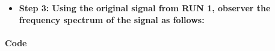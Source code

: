 \documentclass[11pt]{article}
\providecommand{\tightlist}{%
      \setlength{\itemsep}{0pt}\setlength{\parskip}{0pt}}
\begin{document}
    \begin{center}
    \end{center}
    { \hspace*{\fill} \\}
    
    \begin{center}
    \end{center}
    { \hspace*{\fill} \\}
    
    \begin{itemize}
\tightlist
\item
  \textbf{Step 3: Using the original signal from RUN 1, observer the
  frequency spectrum of the signal as follows:}
\end{itemize}

\hypertarget{code}{%
\paragraph{Code}\label{code}}
\end{document}
